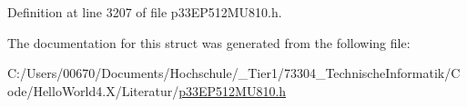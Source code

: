 Definition at line 3207 of file p33\+E\+P512\+M\+U810.\+h.



The documentation for this struct was generated from the following file\+:\begin{DoxyCompactItemize}
\item 
C\+:/\+Users/00670/\+Documents/\+Hochschule/\+\_\+\+Tier1/73304\+\_\+\+Technische\+Informatik/\+Code/\+Hello\+World4.\+X/\+Literatur/\hyperlink{p33_e_p512_m_u810_8h}{p33\+E\+P512\+M\+U810.\+h}\end{DoxyCompactItemize}
